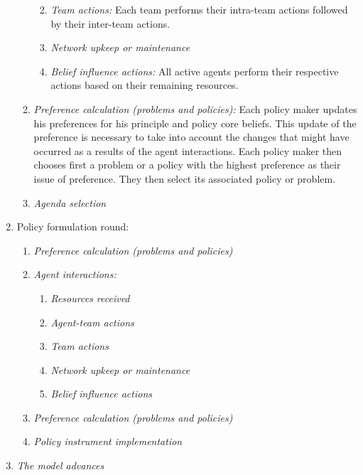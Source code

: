 \begin{enumerate}
\begin{enumerate}
\begin{enumerate}
\begin{enumerate}
			\end{enumerate}
		\item \emph{Team actions:} Each team performs their intra-team actions followed by their inter-team actions.
		\item \emph{Network upkeep or maintenance}
		\item \emph{Belief influence actions:} All active agents perform their respective actions based on their remaining resources.
		\end{enumerate}

	\item \emph{Preference calculation (problems and policies):} Each policy maker updates his preferences for his principle and policy core beliefs. This update of the preference is necessary to take into account the changes that might have occurred as a results of the agent interactions. Each policy maker then chooses first a problem or a policy with the highest preference as their issue of preference. They then select its associated policy or problem.
	\item \emph{Agenda selection}
	\end{enumerate}
	
\item Policy formulation round:

	\begin{enumerate}
	\item \emph{Preference calculation (problems and policies)}
	\item \emph{Agent interactions:} 

		\begin{enumerate}
		\item \emph{Resources received}
		\item \emph{Agent-team actions}
		\item \emph{Team actions}
		\item \emph{Network upkeep or maintenance}
		\item \emph{Belief influence actions}
		\end{enumerate}

	\item \emph{Preference calculation (problems and policies)}
	\item \emph{Policy instrument implementation} 
	\end{enumerate}
	
\item \emph{The model advances}

\end{enumerate}

